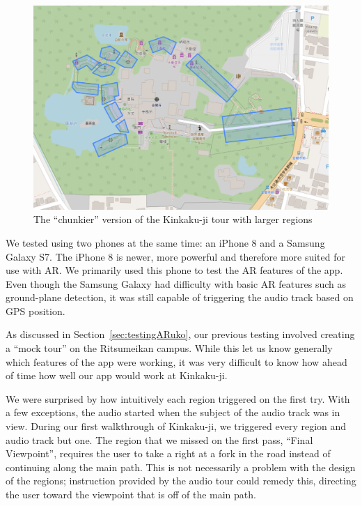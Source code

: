 \documentclass[a4paper, 10pt, american, titlepage]{article}
\begin{document}
\begin{figure}[h]
	\centering
	\includegraphics[width=\textwidth]{kinkakuji-chunkier-tour.png}
	\caption[The ``chunkier'' version of the Kinkaku-ji tour]{The ``chunkier''
		version of the Kinkaku-ji tour with larger regions}
	\label{fig:kinkakujiChunkierTour}
\end{figure}

We tested using two phones at the same time: an iPhone 8 and a Samsung Galaxy
S7. The iPhone 8 is newer, more powerful and therefore more suited for use with
AR. We primarily used this phone to test the AR features of the app. Even
though the Samsung Galaxy had difficulty with basic AR features such as
ground-plane detection, it was still capable of triggering the audio track
based on GPS position.

As discussed in Section~\ref{sec:testingARuko}, our previous testing involved
creating a ``mock tour'' on the Ritsumeikan campus. While this let us know
generally which features of the app were working, it was very difficult to know
how ahead of time how well our app would work at Kinkaku-ji.

We were surprised by how intuitively each region triggered on the first try.
With a few exceptions, the audio started when the subject of the audio track
was in view. During our first walkthrough of Kinkaku-ji, we triggered every
region and audio track but one. The region that we missed on the first pass,
``Final Viewpoint'', requires the user to take a right at a fork in the road
instead of continuing along the main path. This is not necessarily a problem
with the design of the regions; instruction provided by the audio tour could
remedy this, directing the user toward the viewpoint that is off of the main
path.
\end{document}
